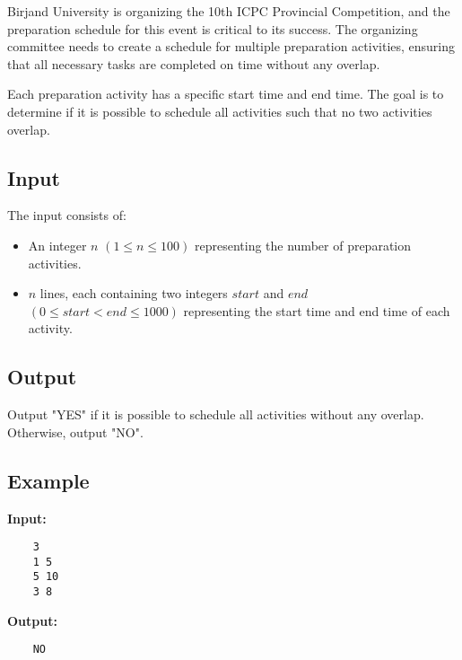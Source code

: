 
Birjand University is organizing the 10th ICPC Provincial Competition, and the preparation schedule for this event is critical to its success. The organizing committee needs to create a schedule for multiple preparation activities, ensuring that all necessary tasks are completed on time without any overlap.

Each preparation activity has a specific start time and end time. The goal is to determine if it is possible to schedule all activities such that no two activities overlap.

\subsection*{Input}

The input consists of:
\begin{itemize}
	\item An integer $n$ $(1 \leq n \leq 100)$ representing the number of preparation activities.
	\item $n$ lines, each containing two integers $start$ and $end$ $(0 \leq start < end \leq 1000)$ representing the start time and end time of each activity.
\end{itemize}

\subsection*{Output}

Output "YES" if it is possible to schedule all activities without any overlap. Otherwise, output "NO".

\subsection*{Example}

\textbf{Input:}
\begin{verbatim}
	3
	1 5
	5 10
	3 8
\end{verbatim}

\textbf{Output:}
\begin{verbatim}
	NO
\end{verbatim}
